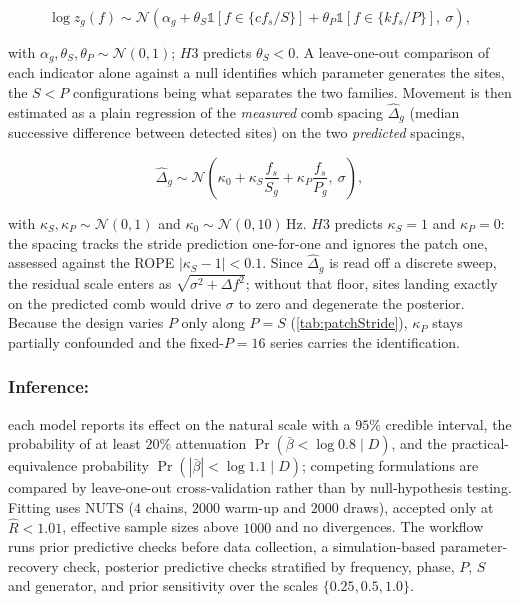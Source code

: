 \begin{equation}
\label{eq:h3_sites}
\log z_g(f)
\sim
\mathcal{N}\!\left(
\alpha_g
+
\theta_S \mathbb{1}[f \in \{c f_s/S\}]
+
\theta_P \mathbb{1}[f \in \{k f_s/P\}],
\ \sigma
\right),
\end{equation}

with $\alpha_g,\theta_S,\theta_P \sim \mathcal{N}(0,1)$; $H3$ predicts $\theta_S < 0$. A leave-one-out comparison of each indicator alone against a null identifies which parameter generates the sites, the $S<P$ configurations being what separates the two families. Movement is then estimated as a plain regression of the \emph{measured} comb spacing $\hat\Delta_g$ (median successive difference between detected sites) on the two \emph{predicted} spacings,

\begin{equation}
\label{eq:h3_move}
\hat\Delta_g
\sim
\mathcal{N}\!\left(
\kappa_0
+
\kappa_S \frac{f_s}{S_g}
+
\kappa_P \frac{f_s}{P_g},
\ \sigma
\right),
\end{equation}

with $\kappa_S, \kappa_P \sim \mathcal{N}(0,1)$ and $\kappa_0 \sim \mathcal{N}(0,10)\,\mathrm{Hz}$. $H3$ predicts $\kappa_S = 1$ and $\kappa_P = 0$: the spacing tracks the stride prediction one-for-one and ignores the patch one, assessed against the ROPE $|\kappa_S - 1| < 0.1$. Since $\hat\Delta_g$ is read off a discrete sweep, the residual scale enters as $\sqrt{\sigma^2 + \Delta f^2}$; without that floor, sites landing exactly on the predicted comb would drive $\sigma$ to zero and degenerate the posterior. Because the design varies $P$ only along $P = S$ (\autoref{tab:patchStride}), $\kappa_P$ stays partially confounded and the fixed-$P{=}16$ series carries the identification.

\subsubsection{Inference:} each model reports its effect on the natural scale with a $95\%$ credible interval, the probability of at least $20\%$ attenuation $\Pr(\bar\beta < \log 0.8 \mid D)$, and the practical-equivalence probability $\Pr(|\bar\beta| < \log 1.1 \mid D)$; competing formulations are compared by leave-one-out cross-validation rather than by null-hypothesis testing. Fitting uses NUTS ($4$ chains, $2000$ warm-up and $2000$ draws), accepted only at $\hat R < 1.01$, effective sample sizes above $1000$ and no divergences. The workflow runs prior predictive checks before data collection, a simulation-based parameter-recovery check, posterior predictive checks stratified by frequency, phase, $P$, $S$ and generator, and prior sensitivity over the scales $\{0.25, 0.5, 1.0\}$.

